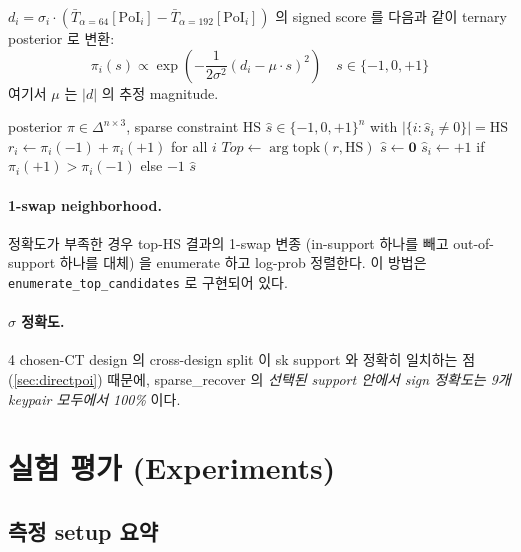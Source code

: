 \documentclass[11pt]{article}
\theoremstyle{plain}
\theoremstyle{definition}
\theoremstyle{remark}
\newcommand{\HS}{\mathrm{HS}}
\begin{document}
$d_i = \sigma_i \cdot (\bar{T}_{\alpha=64}[\mathrm{PoI}_i] -
\bar{T}_{\alpha=192}[\mathrm{PoI}_i])$ 의 signed score 를 다음과 같이 ternary
posterior 로 변환:
\begin{equation}
\pi_i(s) \propto \exp\left( -\frac{1}{2 \sigma^2} (d_i - \mu \cdot s)^2 \right)
\quad s \in \{-1, 0, +1\}
\end{equation}
여기서 $\mu$ 는 $|d|$ 의 추정 magnitude.

\begin{algorithm}[h!]
\caption{Greedy sparse ternary recovery (HW=HS MAP)}
\label{alg:sparse-recover}
\begin{algorithmic}[1]
\Require posterior $\pi \in \Delta^{n \times 3}$, sparse constraint $\HS$
\Ensure $\hat{s} \in \{-1, 0, +1\}^n$ with $|\{i: \hat{s}_i \neq 0\}| = \HS$
\State $r_i \gets \pi_i(-1) + \pi_i(+1)$ for all $i$ 
\State $\mathit{Top} \gets \arg\mathrm{topk}(r, \HS)$ 
\State $\hat{s} \gets \mathbf{0}$
   \State $\hat{s}_i \gets +1$ if $\pi_i(+1) > \pi_i(-1)$ else $-1$
\EndFor
\Return $\hat{s}$
\end{algorithmic}
\end{algorithm}

\paragraph{1-swap neighborhood.} 정확도가 부족한 경우 top-$\HS$ 결과의
1-swap 변종 (in-support 하나를 빼고 out-of-support 하나를 대체) 을 enumerate
하고 log-prob 정렬한다. 이 방법은 \texttt{enumerate\_top\_candidates} 로
구현되어 있다.

\paragraph{$\sigma$ 정확도.} 4 chosen-CT design 의 cross-design split 이 sk
support 와 정확히 일치하는 점 (\cref{sec:directpoi}) 때문에, sparse\_recover
의 \emph{선택된 support 안에서 sign 정확도는 9개 keypair 모두에서 100\%}
이다.

\section{실험 평가 (Experiments)}
\label{sec:exp}

\subsection{측정 setup 요약}
\end{document}
